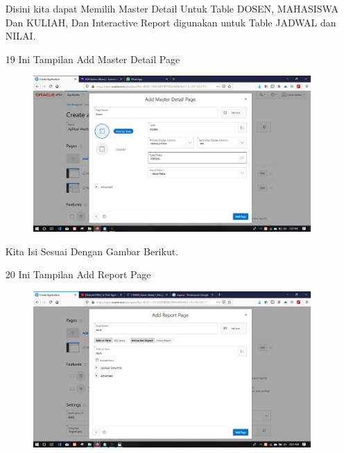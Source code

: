 \begin{enumerate}
\par
Disini kita dapat Memilih Master Detail Untuk Table DOSEN, MAHASISWA Dan KULIAH, Dan Interactive Report digunakan untuk Table JADWAL dan NILAI.

\newpage
\item[19]Ini Tampilan Add Master Detail Page

\begin{figure}[!htbp]
    \begin{center}
    \includegraphics[scale=0.2]{figures/23.png}
    \end{center}   
    \end{figure}
    
\par
Kita Isi Sesuai Dengan Gambar Berikut.

\item[20]Ini Tampilan Add Report Page

\begin{figure}[!htbp]
    \begin{center}
    \includegraphics[scale=0.2]{figures/32.png}
    \end{center}   
    \end{figure}
    

\end{enumerate}
